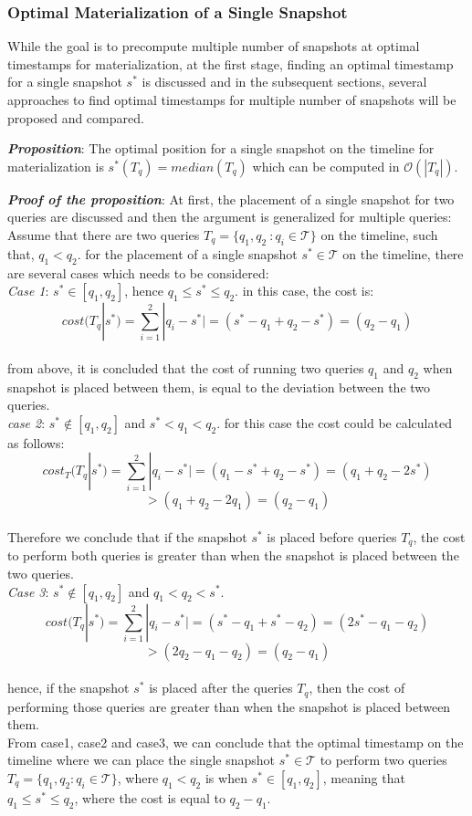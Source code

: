 \subsubsection{Optimal Materialization of a Single Snapshot}
While the goal is to precompute multiple number of snapshots at optimal timestamps for materialization, at the first stage, finding an optimal timestamp for a single snapshot $s^*$ is discussed and in the subsequent sections, several approaches to find optimal timestamps for multiple number of snapshots will be proposed and compared.

\textbf{\emph{Proposition}}: The optimal position for a single snapshot on the timeline for materialization is $s^*(T_q)=median(T_q)$ which can be computed in $\mathcal{O}(|T_q|)$.


\textbf{\emph{Proof of the proposition}}:
At first, the placement of a single snapshot for two queries are discussed and then the argument is generalized for multiple queries:\\
Assume that there are two queries $T_q=\{q_1,q_2\ : q_i \in \mathcal{T}\}$ on the timeline, such that, $q_1<q_2$. for the placement of a single snapshot $s^* \in \mathcal{T}$ on the timeline, there are several cases which needs to be considered:\\
\emph{Case 1}:
$s^* \in [q_1,q_2]$, hence $q_1\leq s^*\leq q_2$.
in this case, the cost is:\\
$$cost(T_q|s^*)=\sum_{i=1}^2|q_i-s^*| = (s^*-q_1+q_2-s^*)=(q_2-q_1)$$\\
from above, it is concluded that the cost of running two queries $q_1$ and $q_2$ when snapshot is placed between them, is equal to the deviation between the two queries.\\
\emph{case 2}:
$s^* \notin [q_1,q_2]$ and $s^* < q_1 < q_2$. for this case the cost could be calculated as follows:
$$cost_T(T_q|s^*)=\sum_{i=1}^2|q_i-s^*| = (q_1-s^*+q_2-s^*)=(q_1+q_2-2s^*) $$$$>(q_1+q_2-2q_1)=(q_2-q_1)$$\\
Therefore we conclude that if the snapshot $s^*$ is placed before queries $T_q$, the cost to perform both queries is greater than when the snapshot is placed between the two queries.\\
\emph{Case 3}:
$s^* \notin [q_1,q_2]$ and $q_1 < q_2 < s^*$.
$$cost(T_q|s^*)=\sum_{i=1}^2|q_i-s^*| = (s^*-q_1+s^*-q_2)=(2s^*-q_1-q_2) $$$$>(2q_2-q_1-q_2)=(q_2-q_1)$$\\
hence, if the snapshot $s^*$ is placed after the queries $T_q$, then the cost of performing those queries are greater than when the snapshot is placed between them.\\
From case1, case2 and case3, we can conclude that the optimal timestamp on the timeline where we can place the single snapshot $s^* \in \mathcal{T}$ to perform two queries $T_q = \{q_1,q_2:q_i\in \mathcal{T}\}$, where $q_1<q_2$ is when $s^* \in [q_1,q_2]$, meaning that $q_1 \leq s^* \leq q_2$, where the cost is equal to $q_2-q_1$.\\

